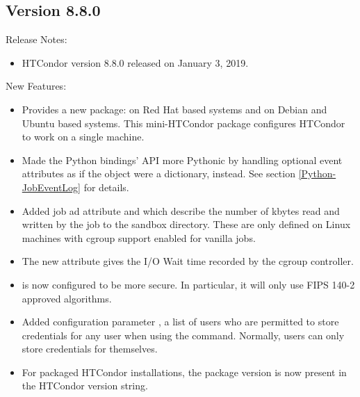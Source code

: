 \subsection*{\label{sec:New-8-8-0}Version 8.8.0}

\noindent Release Notes:

\begin{itemize}

\item HTCondor version 8.8.0 released on January 3, 2019.

\end{itemize}


\noindent New Features:

\begin{itemize}

\item Provides a new package:  on Red Hat based systems and
 on Debian and Ubuntu based systems.
This mini-HTCondor package configures HTCondor to work on a single machine.

\item Made the Python bindings'  API more Pythonic by
handling optional event attributes as if the  object
were a dictionary, instead.  See section \ref{Python-JobEventLog} for details.

\item Added job ad attribute  and 
which describe the number of kbytes read and written by the job to the sandbox
directory.  These are only defined on Linux machines with cgroup support enabled
for vanilla jobs.

\item The new  attribute gives the I/O Wait time recorded by the
cgroup controller.

\item {} is now configured to be more secure. In particular,
it will only use FIPS 140-2 approved algorithms.

\item Added configuration parameter ,
a list of users who are permitted to store credentials for any user
when using the  command. Normally, users can
only store credentials for themselves.

\item For packaged HTCondor installations, the package version is now present
in the HTCondor version string.

\end{itemize}

